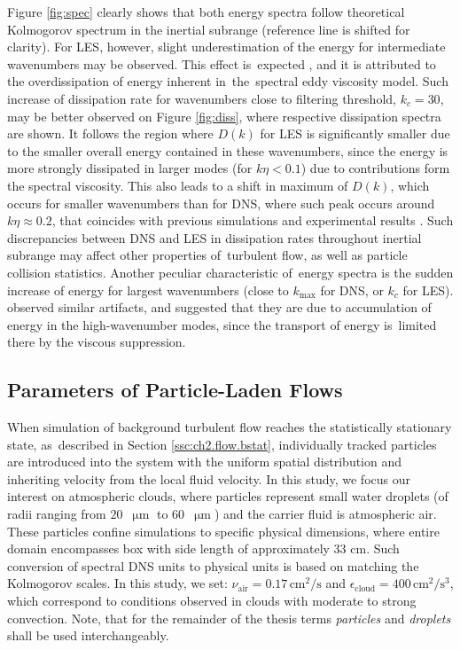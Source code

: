 \documentclass{pracamgren}
\begin{document}
Figure \ref{fig:spec} clearly shows that both energy spectra follow theoretical Kolmogorov spectrum in the inertial subrange (reference line is shifted for clarity).
For LES, however, slight underestimation of the energy for intermediate wavenumbers may be observed.
This effect is~expected \parencite{Jin2010}, and it is attributed to the overdissipation of energy inherent in~the~spectral eddy viscosity model.
Such increase of dissipation rate for wavenumbers close to filtering threshold, $k_{c} = 30$, may be better observed on Figure \ref{fig:diss}, where respective dissipation spectra are shown.
It follows the region where $D(k)$ for LES is significantly smaller due to the smaller overall energy contained in these wavenumbers, since the energy is more strongly dissipated in larger modes (for $k \eta < 0.1$) due to contributions form the spectral viscosity.
This also leads to a shift in maximum of $D(k)$, which occurs for smaller wavenumbers than for DNS, where such peak occurs around $k \eta \approx 0.2$, that coincides with previous simulations and experimental results \parencite{Wang1993}.
Such discrepancies between DNS and LES in dissipation rates throughout inertial subrange may affect other properties of~turbulent flow, as well as particle collision statistics.
Another peculiar characteristic of~energy spectra is the sudden increase of energy for largest wavenumbers (close to $k_{\max}$ for DNS, or $k_{c}$ for LES).
\textcite{Rosa2017} observed similar artifacts, and suggested that they are due to accumulation of energy in the high-wavenumber modes, since the transport of energy is~limited there by the viscous suppression.



\subsection{Parameters of Particle-Laden Flows}
\label{ssc:ch2.flow.part}

When simulation of background turbulent flow reaches the statistically stationary state, as~described in Section \ref{ssc:ch2.flow.bstat}, individually tracked particles are introduced into the system with the uniform spatial distribution and inheriting velocity from the local fluid velocity.
In this study, we focus our interest on atmospheric clouds, where particles represent small water droplets (of radii ranging from $20$~$\upmu\text{m}$ to $60$~$\upmu\text{m}$) and the carrier fluid is atmospheric air.
These particles confine simulations to specific physical dimensions, where entire domain encompasses box with side length of approximately 33 cm.
Such conversion of spectral DNS units to physical units is based on matching the Kolmogorov scales.
In this study, we set: $\nu_{\text{air}} = 0.17 \, \text{cm}^{2} / \text{s} $ and $\epsilon_{\text{cloud}} = 400 \, \text{cm}^{2} / \text{s}^{3}$, which correspond to conditions observed in clouds with moderate to strong convection.
Note, that for the remainder of the thesis terms \emph{particles} and \emph{droplets} shall be used interchangeably.
\end{document}
